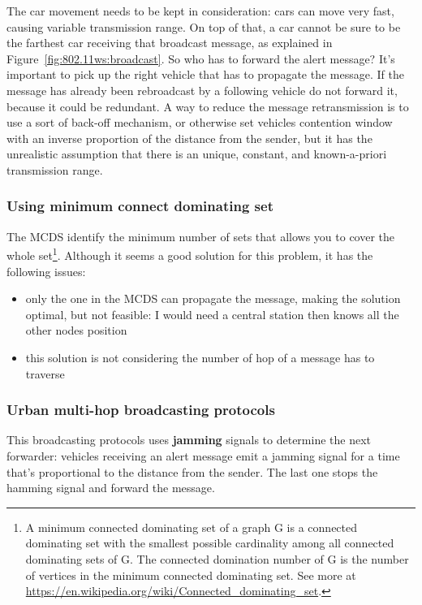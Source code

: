 The car movement needs to be kept in consideration: cars can move very fast,
causing variable transmission range. On top of that, a car cannot be sure to
be the farthest car receiving that broadcast message, as explained in
Figure~\ref{fig:802.11ws:broadcast}. So who has to forward the alert message?
It's important to pick up the right vehicle that has to propagate the message.
If the message has already been rebroadcast by a following vehicle do not
forward it, because it could be redundant. A way to reduce the message
retransmission is to use a sort of back-off mechanism, or otherwise set vehicles
contention window with an inverse proportion of the distance from the sender,
but it has the unrealistic assumption that there is an unique, constant, and
known-a-priori transmission range.

\subsubsection{Using minimum connect dominating set} The MCDS identify the
minimum number of sets that allows you to cover the whole set\footnote{A minimum
  connected dominating set of a graph G is a connected dominating set with the
  smallest possible cardinality among all connected dominating sets of G. The
  connected domination number of G is the number of vertices in the minimum
  connected dominating set. See more at
  \url{https://en.wikipedia.org/wiki/Connected_dominating_set}.
}.
Although it seems a good solution for this problem, it has the following
issues:
\begin{itemize}
\item only the one in the MCDS can propagate the message, making the solution
  optimal, but not feasible: I would need a central station then knows all the
  other nodes position
\item this solution is not considering the number of hop of a message has to
  traverse
\end{itemize}

\subsubsection{Urban multi-hop broadcasting protocols} This broadcasting
protocols uses \textbf{jamming} signals to determine the next forwarder:
vehicles receiving an alert message emit a jamming signal for a time that's
proportional to the distance from the sender. The last one stops the hamming
signal and forward the message.

